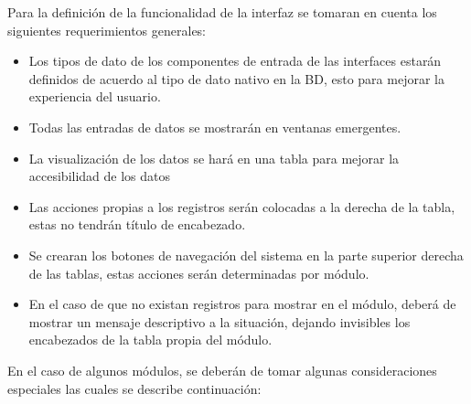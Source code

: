 		Para la definici\'on de la funcionalidad de la interfaz se tomaran en cuenta los siguientes requerimientos generales:
		\begin{itemize}
			\item Los tipos de dato de los componentes de entrada de las interfaces estar\'an definidos de acuerdo al tipo de dato nativo en la BD, esto para mejorar la experiencia del usuario.
			\item Todas las entradas de datos se mostrar\'an en ventanas emergentes.
			\item La visualizaci\'on de los datos se har\'a en una tabla para mejorar la accesibilidad de los datos
			\item Las acciones propias a los registros serán colocadas a la derecha de la tabla, estas no tendr\'an t\'itulo de encabezado.
			\item Se crearan los botones de navegaci\'on del sistema en la parte superior derecha de las tablas, estas acciones ser\'an determinadas por m\'odulo.
			\item En el caso de que no existan registros para mostrar en el m\'odulo, deber\'a de mostrar un mensaje descriptivo a la situaci\'on, dejando invisibles los encabezados de la tabla propia del m\'odulo.
		\end{itemize}

		En el caso de algunos m\'odulos, se deber\'an de tomar algunas consideraciones especiales las cuales se describe continuaci\'on:

